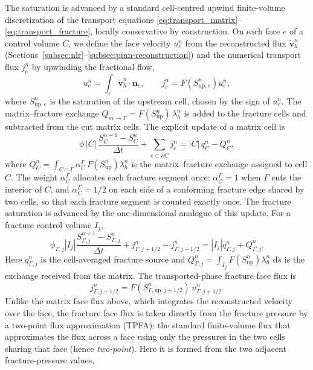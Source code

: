 \documentclass[a4paper,fleqn]{cas-sc}
\newcommand{\dd}{\,\mathrm{d}}
\newcommand{\vflux}{\mathbf{v}}
\begin{document}
The saturation is advanced by a standard cell-centred upwind finite-volume
discretization of the transport equations
\eqref{eq:transport_matrix}--\eqref{eq:transport_fracture}, locally conservative
by construction. On each face \(e\) of a control volume \(C\), we define the face velocity
\(u_e^n\) from the reconstructed flux \(\widetilde{\vflux}_h^n\)
(Sections~\ref{subsec:nlr}--\ref{subsec:pinn-reconstruction}) and the numerical
transport flux \(j_e^n\) by upwinding the fractional flow,
\[
  u_e^n=\int_e \widetilde{\vflux}_h^n\cdot\mathbf{n}_e,
  \qquad
  j_e^n = F\!\left(S^n_{\mathrm{up},e}\right)u_e^n ,
\]
where \(S^n_{\mathrm{up},e}\) is the saturation of the upstream cell, chosen by the
sign of \(u_e^n\). The matrix--fracture
exchange \(Q_{m\to\Gamma}=F(S^n_{\mathrm{up}})\,\lambda_h^n\) is added to the
fracture cells and subtracted from the cut matrix cells. The explicit update of a
matrix cell is
\begin{equation}
  \phi\,|C|\,\frac{S_C^{n+1}-S_C^n}{\Delta t}
  + \sum_{e\subset\partial C}j_e^n
  = |C|\,q_C^n - Q_C^n ,
  \label{eq:fv_update}
\end{equation}
where
\(Q_C^n=\int_{C\cap\Gamma}\alpha_C^\Gamma\,F(S_{\mathrm{up}}^n)\lambda_h^n\) is the
matrix--fracture exchange assigned to cell \(C\). The weight \(\alpha_C^\Gamma\)
allocates each fracture segment once: \(\alpha_C^\Gamma=1\) when \(\Gamma\) cuts the
interior of \(C\), and \(\alpha_C^\Gamma=1/2\) on each side of a conforming fracture
edge shared by two cells, so that each fracture segment is counted exactly once. The
fracture saturation is advanced by the one-dimensional analogue of this update.
For a fracture control volume \(I_j\),
\[
  \phi_{\Gamma,j}|I_j|
  \frac{S_{\Gamma,j}^{n+1}-S_{\Gamma,j}^{n}}{\Delta t}
  + j_{\Gamma,j+1/2}^{n}-j_{\Gamma,j-1/2}^{n}
  =
  |I_j|q_{\Gamma,j}^{n}+Q_{\Gamma,j}^{n}.
\]
Here \(q_{\Gamma,j}^{n}\) is the cell-averaged fracture source and
\(Q_{\Gamma,j}^{n}=\int_{I_j}F(S_{\mathrm{up}}^n)\lambda_h^n\,\dd s\) is the
exchange received from the matrix. The transported-phase fracture face flux is
\[
  j_{\Gamma,j+1/2}^{n}
  =
  F(S_{\Gamma,\mathrm{up},j+1/2}^{n})\,u_{\Gamma,j+1/2}^{n}.
\]
Unlike the matrix face flux above, which integrates the reconstructed velocity over
the face, the fracture face flux is taken directly from the fracture pressure by a
two-point flux approximation (TPFA): the standard finite-volume flux that
approximates the flux across a face using only the pressures in the two cells
sharing that face (hence \emph{two-point}). Here it is formed from the two adjacent
fracture-pressure values,
\end{document}
